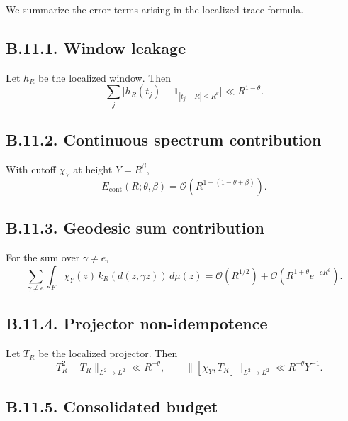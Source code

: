 We summarize the error terms arising in the localized trace formula.

\subsection*{B.11.1. Window leakage}

\begin{lemma}\label{lem:B11-leak}
Let $h_R$ be the localized window.
Then
\[
\sum_j\big|h_R(t_j)-\mathbf{1}_{|t_j-R|\le R^\theta}\big|
\ll R^{1-\theta}.
\]
\end{lemma}

\subsection*{B.11.2. Continuous spectrum contribution}

\begin{lemma}\label{lem:B11-cont}
With cutoff $\chi_Y$ at height $Y=R^\beta$,
\[
E_{\mathrm{cont}}(R;\theta,\beta)
=\mathcal{O}\!\left(R^{1-(1-\theta+\beta)}\right).
\]
\end{lemma}

\subsection*{B.11.3. Geodesic sum contribution}

\begin{lemma}\label{lem:B11-geod}
For the sum over $\gamma\ne e$,
\[
\sum_{\gamma\ne e}\int_F \chi_Y(z)\,k_R(d(z,\gamma z))\,d\mu(z)
=\mathcal{O}(R^{1/2})+\mathcal{O}(R^{1+\theta}e^{-cR^\theta}).
\]
\end{lemma}

\subsection*{B.11.4. Projector non-idempotence}

\begin{lemma}\label{lem:B11-proj}
Let $T_R$ be the localized projector.
Then
\[
\|T_R^2-T_R\|_{L^2\to L^2}\ll R^{-\theta},
\qquad
\|[\chi_Y,T_R]\|_{L^2\to L^2}\ll R^{-\theta}Y^{-1}.
\]
\end{lemma}

\subsection*{B.11.5. Consolidated budget}

